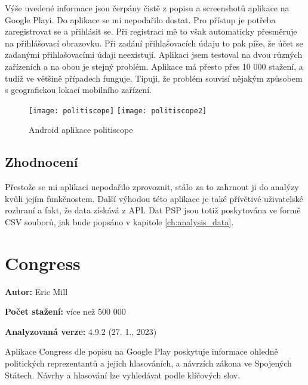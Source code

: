 \noindent Výše uvedené informace jsou čerpány čistě z popisu a screenshotů aplikace na Google Playi. Do aplikace se mi nepodařilo dostat. Pro přístup je potřeba zaregistrovat se a přihlásit se. Při registraci mě to však automaticky přesměruje na přihlášovací obrazovku. Při zadání přihlašovacích údaju to pak píše, že účet se zadanými přihlašovacími údaji neexistují. Aplikaci jsem testoval na dvou různých zařízeních a na obou je stejný problém. Aplikace má přesto přes 10 000 \linebreak stažení, a tudíž ve většině případech funguje. Tipuji, že problém souvisí nějakým způsobem \linebreak s geografickou lokací mobilního zařízení.

\begin{figure}
	\centering

	\texttt{[image: politiscope]}
	\texttt{[image: politiscope2]}
	
	\caption{Android aplikace politiscope \cite{politiscope}}
	\label{fig:politoscope}
\end{figure}

\subsection{Zhodnocení}
Přestože se mi  aplikaci nepodařilo zprovoznit, stálo za to zahrnout ji do analýzy kvůli jejím funkčnostem. Další výhodou této aplikace je také přívětivé uživatelské rozhraní a fakt, že data získává z API. Dat PSP jsou totiž poskytována ve formě CSV souborů, jak bude popsáno \linebreak v kapitole \ref{ch:analysis_data}.

\section{Congress}

\begin{description}
	\item \textbf{Autor:} Eric Mill
	\item \textbf{Počet stažení:} více než 500 000
	\item \textbf{Analyzovaná verze:} 4.9.2 (27. 1., 2023)
\end{description}

\noindent Aplikace Congress \cite{congress} dle popisu na Google Play poskytuje informace ohledně politických reprezentantů a jejich hlasováních, a návrzích zákona ve Spojených Státech. Návrhy a hlasování lze vyhledávat podle klíčových slov.

